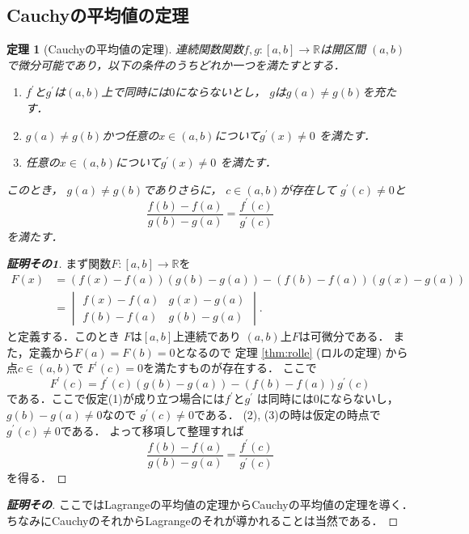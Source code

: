 \documentclass[leqno, a4paper, 12pt]{jsarticle}
\newtheorem{thm}{定理}
\newcommand{\rr}{\mathbb{R}}
\newcommand{\bibun}[1]{#1^{\prime}}
\begin{document}
\subsection{Cauchyの平均値の定理}

\begin{thm}[Cauchyの平均値の定理]
連続関数関数$f,g:[a,b]\to \rr$は開区間
$(a, b)$で微分可能であり，以下の条件のうちどれか一つを満たすとする．
\begin{enumerate}
\item 
$\bibun{f}$と$\bibun{g}$は$(a, b)$上で同時には$0$にならないとし，
$g$は$g(a)\neq g(b)$を充たす．
\item 
$g(a)\neq g(b)$かつ任意の$x\in (a, b)$について$\bibun{g}(x)\neq 0$
を満たす．
\item 
任意の$x\in (a, b)$について$\bibun{g}(x)\neq 0$
を満たす．
\end{enumerate}

このとき，
$g(a)\neq g(b)$でありさらに，
$c\in (a, b)$が存在して
$\bibun{g}(c)\neq 0$と
\[
\frac{f(b)-f(a)}{g(b)-g(a)}=\frac{f^{\prime}(c)}{g^{\prime}(c)}
\]
を満たす．
\end{thm}
\begin{proof}[\textbf{証明その1}]

まず関数$F: [a, b]\to \rr$を
\begin{align*}
F(x)&=(f(x)-f(a))(g(b)-g(a))-(f(b)-f(a))(g(x)-g(a))\\
&=
\begin{vmatrix}
f(x)-f(a) & g(x)-g(a)\\
f(b)-f(a) & g(b)-g(a)
\end{vmatrix}. 
\end{align*}
と定義する．このとき
$F$は$[a, b]$上連続であり
$(a, b)$上$F$は可微分である．
また，定義から$F(a)=F(b)=0$となるので
定理 \ref{thm:rolle} (ロルの定理)
から点$c\in (a, b)$で
$\bibun{F}(c)=0$を満たすものが存在する．
ここで
\[
\bibun{F}(c)=\bibun{f}(c)(g(b)-g(a))
-(f(b)-f(a))\bibun{g}(c)
\]
である．ここで仮定(1)が成り立つ場合には$\bibun{f}$と$\bibun{g}$
は同時には$0$にならないし，
$g(b)-g(a)\neq 0$なので
$\bibun{g}(c)\neq 0$である．
(2), (3)の時は仮定の時点で$\bibun{g}(c)\neq 0$である．
よって移項して整理すれば
\[
\frac{f(b)-f(a)}{g(b)-g(a)}=\frac{f^{\prime}(c)}{g^{\prime}(c)}
\]
を得る．
\end{proof}
\begin{proof}[\textbf{証明その}]
ここではLagrangeの平均値の定理からCauchyの平均値の定理を導く．
ちなみにCauchyのそれからLagrangeのそれが導かれることは当然である．

\end{proof}
\end{document}
